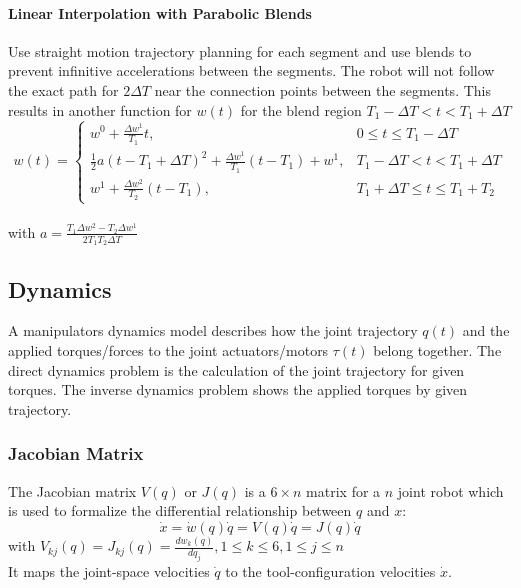 \documentclass[12pt]{article}
\begin{document}
	\paragraph{Linear Interpolation with Parabolic Blends} Use straight motion trajectory planning for each segment and use blends to prevent infinitive accelerations between the segments. The robot will not follow the exact path for $2 \Delta T$ near the connection points between the segments. This results in another function for $w(t)$ for the blend region $T_1 - \Delta T < t < T_1 + \Delta T$\\
	\begin{equation}
	w(t) = 
	\left\{ \begin{array}{ll}
	w^0 + \frac{\Delta w^1}{T_1} t, & 0 \leq t \leq T_1 - \Delta T\\
	\frac{1}{2} a (t - T_1 + \Delta T)^2 + \frac{\Delta w^1}{T_1} (t - T_1) + w^1, & T_1 - \Delta T < t < T_1 + \Delta T\\
	w^1 + \frac{\Delta w^2}{T_2} (t - T_1), & T_1 + \Delta T \leq t \leq T_1 + T_2
	\end{array} \right.
	\end{equation}\\
	with $a = \frac{T_1 \Delta w^2 - T_2 \Delta w^1}{2T_1 T_2 \Delta T}$
	
	\subsection{Dynamics}
	A manipulators dynamics model describes how the joint trajectory $q(t)$ and the applied torques/forces to the joint actuators/motors $\tau(t)$ belong together. The direct dynamics problem is the calculation of the joint trajectory for given torques. The inverse dynamics problem shows the applied torques by given trajectory.
	
	\subsubsection{Jacobian Matrix}
	The Jacobian matrix $V(q)$ or $J(q)$ is a $6 \times n$ matrix for a $n$ joint robot which is used to formalize the differential relationship between $q$ and $x$: $$\dot{x} = \dot{w}(q) \dot{q} = V(q) \dot{q} = J(q) \dot{q}$$ with $V_{kj}(q) = J_{kj}(q) = \frac{dw_k(q)}{dq_j}, 1 \leq k \leq 6, 1 \leq j \leq n$\\
	It maps the joint-space velocities $\dot{q}$ to the tool-configuration velocities $\dot{x}$.
	
\end{document}
